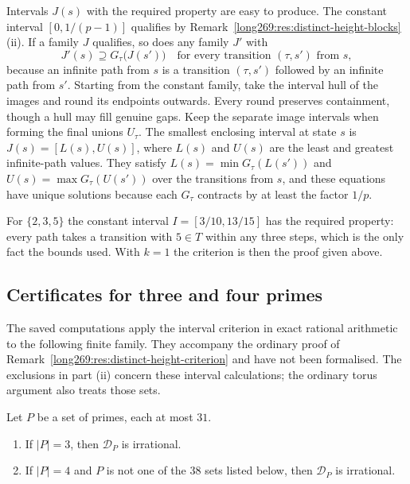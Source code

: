 Intervals $J(s)$ with the required property are easy to produce.  The
constant interval $[0,1/(p-1)]$ qualifies by
Remark~\ref{long269:res:distinct-height-blocks}(ii).  If a family $J$
qualifies, so does any family $J'$ with
\[
 J'(s)\supseteq G_\tau\bigl(J(s')\bigr)\quad\text{for every transition }(\tau,s')\text{ from }s,
\]
because an infinite path from $s$ is a transition $(\tau,s')$ followed by an
infinite path from $s'$.  Starting from the constant family, take the interval hull of the images
and round its endpoints outwards. Every round preserves containment, though
a hull may fill genuine gaps. Keep the separate image intervals when
forming the final unions $U_\tau$. The smallest enclosing interval at state
$s$ is $J(s)=[L(s),U(s)]$, where $L(s)$ and $U(s)$ are the least and
greatest infinite-path values.  They satisfy
$L(s)=\min G_\tau(L(s'))$ and $U(s)=\max G_\tau(U(s'))$ over the transitions
from $s$, and these equations have unique solutions because each $G_\tau$
contracts by at least the factor $1/p$.

For $\{2,3,5\}$ the constant interval $I=[3/10,13/15]$ has the required
property: every path takes a transition with $5\in T$ within any three
steps, which is the only fact the bounds used.  With $k=1$ the criterion is
then the proof given above.

\subsection{Certificates for three and four primes}
\label{long269:sec:distinct-certificates}

The saved computations apply the interval criterion in exact rational
arithmetic to the following finite family. They accompany the ordinary
proof of Remark~\ref{long269:res:distinct-height-criterion} and have not
been formalised. The exclusions in part (ii) concern these interval
calculations; the ordinary torus argument also treats those sets.


\begin{remark}\label{long269:res:distinct-height-sets}
Let $P$ be a set of primes, each at most $31$.
\begin{enumerate}[label=\textup{(\roman*)}]
\item If $|P|=3$, then $\mathcal D_P$ is irrational.
\item If $|P|=4$ and $P$ is not one of the $38$ sets listed below, then
$\mathcal D_P$ is irrational.
\end{enumerate}
\end{remark}


